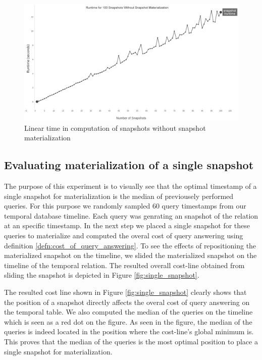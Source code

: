 			\begin{figure}[]
				\centering
				\includegraphics[width=120mm]{figs/runtime.jpg}
				\caption{Linear time in computation of snapshots without snapshot materialization}
				\label{fig:linear_time}
			\end{figure} 
		\subsection{Evaluating materialization of a single snapshot} \label{sec:evaluating_single_snapshot}
			The purpose of this experiment is to visually see that the optimal timestamp of a single snapshot for materialization is the median of previousely performed queries. For this purpose we randomly sampled 60 query timestamps from our temporal database timeline. Each query was genrating an snapshot of the relation at an specific timestamp. In the next step we placed a single snapshot for these queries to materialize and computed the overal cost of query answering using definition \ref{defn:cost_of_query_answering}. To see the effects of repositioning the materialized snapshot on the timeline, we slided the materialized snapshot on the timeline of the temporal relation. The resulted overall cost-line obtained from sliding the snapshot is depicted in Figure \ref{fig:single_snapshot}. 

			The resulted cost line shown in Figure \ref{fig:single_snapshot} clearly shows that the position of a snapshot directly affects the overal cost of query answering on the temporal table. We also computed the median of the queries on the timeline which is seen as a red dot on the figure. As seen in the figure, the median of the queries is indeed located in the position where the cost-line's global minimum is. This proves that the median of the queries is the most optimal position to place a single snapshot for materialization.


